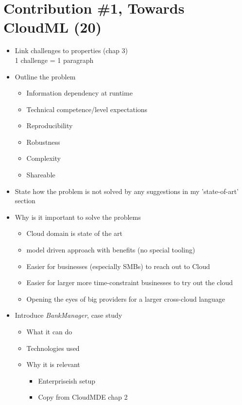 \section{Contribution \#1, Towards CloudML (20)}

\begin{itemize}
  \item Link challenges to properties (chap 3) \\
      1 challenge = 1 paragraph
  \item Outline the problem
    \begin{itemize}
      \item Information dependency at runtime
      \item Technical competence/level expectations
      \item Reproducibility
      \item Robustness
      \item Complexity
      \item Shareable
    \end{itemize}
  \item State how the problem is not solved by any suggestions in my 'state-of-art' section
  \item Why is it important to solve the problems
    \begin{itemize}
      \item Cloud domain is state of the art
      \item model driven approach with benefits (no special tooling)
      \item Easier for businesses (especially SMBs) to reach out to Cloud
      \item Easier for larger more time-constraint businesses to try out the cloud
      \item Opening the eyes of big providers for a larger cross-cloud language
    \end{itemize}
  \item Introduce \emph{BankManager}, case study
  \begin{itemize}
    \item What it can do
    \item Technologies used
    \item Why it is relevant
      \begin{itemize}
        \item Enterpriseish setup
        \item Copy from CloudMDE chap 2
      \end{itemize}
  \end{itemize}
\end{itemize}

